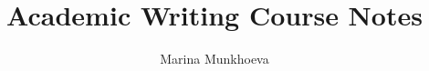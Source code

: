 \documentclass[a4paper, 12pt]{article}
\author{Marina Munkhoeva}
\date{}
\title{Academic Writing Course Notes}
\begin{document}
	\maketitle

\end{document}
